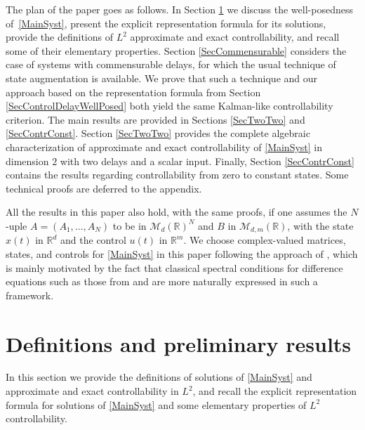 The plan of the paper goes as follows. In Section \ref{SecPrevResults} we discuss the well-posedness of~\eqref{MainSyst}, present the explicit representation formula for its solutions, provide the definitions of $L^2$ approximate and exact controllability, and recall some of their elementary properties. Section \ref{SecCommensurable} considers the case of systems with commensurable delays, for which the usual technique of state augmentation is available. We prove that such a technique and our approach based on the representation formula from Section \ref{SecControlDelayWellPosed} both yield the same Kalman-like controllability criterion. The main results are provided in Sections \ref{SecTwoTwo} and \ref{SecContrConst}. Section \ref{SecTwoTwo} provides the complete algebraic characterization of approximate and exact controllability of \eqref{MainSyst} in dimension $2$ with two delays and a scalar input. Finally, Section \ref{SecContrConst} contains the results regarding controllability from zero to constant states. Some technical proofs are deferred to the appendix.

All the results in this paper also hold, with the same proofs, if one assumes the $N$\nobreakdash-uple $A = (A_1, \dots, A_N)$ to be in $\mathcal M_d(\mathbb R)^N$
and $B$ in $\mathcal M_{d, m}(\mathbb R)$, with the state $x(t)$ in $\mathbb R^d$ and the control $u(t)$ in $\mathbb R^m$. We choose complex-valued matrices, states, and controls for \eqref{MainSyst} in this paper following the approach of \cite{Chitour2016Stability}, which is mainly motivated by the fact that classical spectral conditions for difference equations such as those from \cite{Avellar1980Zeros, Henry1974Linear, Hale2002Strong} and \cite[Chap.\,9]{Hale1993Introduction} are more naturally expressed in such a framework.

\section{Definitions and preliminary results}
\label{SecPrevResults}

In this section we provide the definitions of solutions of \eqref{MainSyst} and approximate and exact controllability in $L^2$, and recall the explicit representation formula for solutions of \eqref{MainSyst} and some elementary properties of $L^2$ controllability.

\label{SecControlDelayWellPosed}

